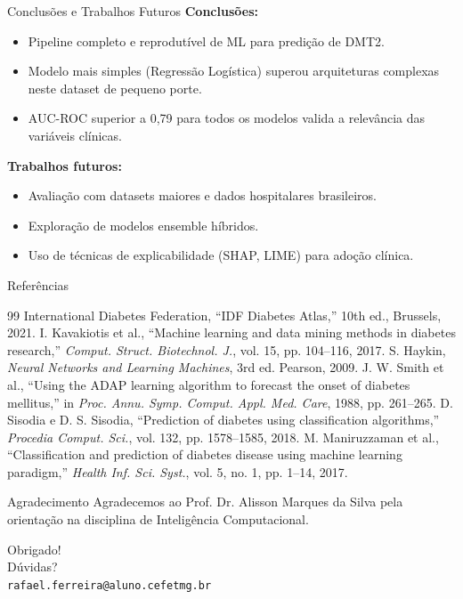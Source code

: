 \documentclass[10pt]{beamer}
\begin{document}
\begin{frame}{Conclusões e Trabalhos Futuros}
    \textbf{Conclusões:}
    \begin{itemize}
        \item Pipeline completo e reprodutível de ML para predição de DMT2.
        \item Modelo mais simples (Regressão Logística) superou arquiteturas complexas neste dataset de pequeno porte.
        \item AUC-ROC superior a 0,79 para todos os modelos valida a relevância das variáveis clínicas.
    \end{itemize}
    \vspace{0.3cm}
    \textbf{Trabalhos futuros:}
    \begin{itemize}
        \item Avaliação com datasets maiores e dados hospitalares brasileiros.
        \item Exploração de modelos ensemble híbridos.
        \item Uso de técnicas de explicabilidade (SHAP, LIME) para adoção clínica.
    \end{itemize}
\end{frame}

\begin{frame}{Referências}
    \footnotesize
    \begin{thebibliography}{99}
         International Diabetes Federation, ``IDF Diabetes Atlas,'' 10th ed., Brussels, 2021.
         I. Kavakiotis et al., ``Machine learning and data mining methods in diabetes research,'' \emph{Comput. Struct. Biotechnol. J.}, vol. 15, pp. 104--116, 2017.
         S. Haykin, \emph{Neural Networks and Learning Machines}, 3rd ed. Pearson, 2009.
         J. W. Smith et al., ``Using the ADAP learning algorithm to forecast the onset of diabetes mellitus,'' in \emph{Proc. Annu. Symp. Comput. Appl. Med. Care}, 1988, pp. 261--265.
         D. Sisodia e D. S. Sisodia, ``Prediction of diabetes using classification algorithms,'' \emph{Procedia Comput. Sci.}, vol. 132, pp. 1578--1585, 2018.
         M. Maniruzzaman et al., ``Classification and prediction of diabetes disease using machine learning paradigm,'' \emph{Health Inf. Sci. Syst.}, vol. 5, no. 1, pp. 1--14, 2017.
    \end{thebibliography}
    \vspace{0.3cm}
    \begin{block}{Agradecimento}
        Agradecemos ao Prof. Dr. Alisson Marques da Silva pela orientação na disciplina de Inteligência Computacional.
    \end{block}
\end{frame}

\begin{frame}
    \centering
    \Huge Obrigado!
    \\[0.5cm]
    \normalsize
    Dúvidas?
    \\[0.5cm]
    \footnotesize
    \texttt{rafael.ferreira@aluno.cefetmg.br}
\end{frame}
\end{document}
